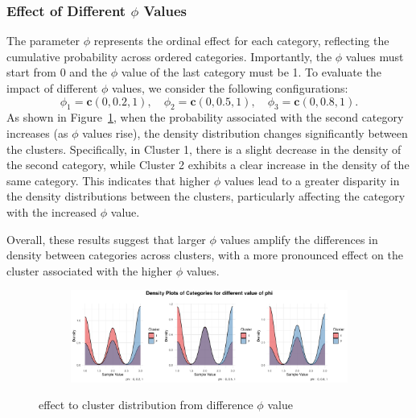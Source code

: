 \documentclass{article}
\begin{document}
\subsubsection*{Effect of Different $\phi$ Values}
The parameter $\phi$ represents the ordinal effect for each category, reflecting the cumulative probability across ordered categories. 
Importantly, the $\phi$ values must start from 0 and the $\phi$ value of the last category must be 1. 
To evaluate the impact of different $\phi$ values, we consider the following configurations:
\[
\phi_1 = \mathbf{c}(0, 0.2, 1), \quad \phi_2 = \mathbf{c}(0, 0.5, 1), \quad \phi_3 = \mathbf{c}(0, 0.8, 1).
\]
As shown in Figure~\ref{fig:phi}, 
when the probability associated with the second category increases (as $\phi$ values rise), 
the density distribution changes significantly between the clusters. 
Specifically, in Cluster 1, there is a slight decrease in the density of the second category, 
while Cluster 2 exhibits a clear increase in the density of the same category. 
This indicates that higher $\phi$ values lead to a greater disparity 
in the density distributions between the clusters, 
particularly affecting the category with the increased $\phi$ value.

Overall, these results suggest that larger $\phi$ values amplify the differences in density between categories across clusters, 
with a more pronounced effect on the cluster associated with the higher $\phi$ values.

\begin{figure}[h]
  \centering
  \begin{subfigure}{1.0\textwidth}
      \centering
      \includegraphics[width=\textwidth]{images/para_sim/phi.png}
  \end{subfigure}
  \caption{effect to cluster distribution from difference $\phi$ value}
  \label{fig:phi}
\end{figure}


\end{document}
